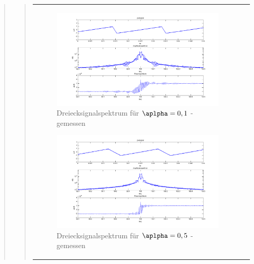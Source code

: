 \begin{quote}
\begin{quote}
\begin{center}
\begin{tabular}{ll}
\begin{minipage}{0.6\textwidth}
                
                \end{minipage}

                \begin{minipage}{0.6\textwidth}

                    \begin{figure}[H]
                        \label{fig:}            
                        \includegraphics[scale=0.3]{./Bilder/drei_alpha1_-_gemessen.png} %
                        \caption{Dreiecksignalspektrum für $\aplpha = 0,1$ - gemessen}
                    \end{figure}                
                    
                    \begin{figure}[H]
                        \label{fig:}            
                        \includegraphics[scale=0.3]{./Bilder/drei_alpha5_-_gemessen.png} %
                        \caption{Dreiecksignalspektrum für $\aplpha = 0,5$ - gemessen}
                    \end{figure}                


\end{minipage}
\end{tabular}
\end{center}
\end{quote}
\end{quote}
